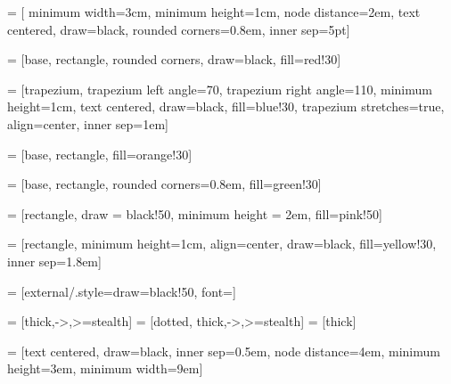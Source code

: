 \usepackage{tikz}
\usepackage{xparse}
\usetikzlibrary{positioning, fit, backgrounds, shapes, arrows.meta}


 = [
    minimum width=3cm,
    minimum height=1cm,
    node distance=2em,
    text centered,
    draw=black,
    rounded corners=0.8em,
    inner sep=5pt]

 = [base, rectangle, rounded corners, draw=black, fill=red!30]

 = [trapezium, trapezium left angle=70, trapezium right angle=110,
 minimum height=1cm, text centered, draw=black, fill=blue!30, trapezium stretches=true,
 align=center, inner sep=1em]

 = [base, rectangle, fill=orange!30]

 = [base, rectangle, rounded corners=0.8em, fill=green!30]

 = [rectangle, draw = black!50, minimum height = 2em, fill=pink!50]

 = [rectangle, minimum height=1cm, align=center, draw=black, fill=yellow!30, inner sep=1.8em]

 = [external/.style={draw=black!50}, font={\fontsize{13pt}{12}\selectfont}]

 = [thick,->,>=stealth]
 = [dotted, thick,->,>=stealth]
 = [thick]

\NewDocumentCommand{}
\newcommand\insertitem[1]{\item #1}

\NewDocumentCommand{}

\newcommand{\shortarrowlength}{3.1em}

 = [text centered, draw=black, inner sep=0.5em, node
distance=4em, minimum height=3em, minimum width=9em]

